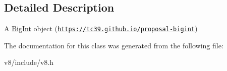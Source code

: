 \subsection{Detailed Description}
A \mbox{\hyperlink{classv8_1_1BigInt}{Big\+Int}} object (\href{https://tc39.github.io/proposal-bigint}{\tt https\+://tc39.\+github.\+io/proposal-\/bigint}) 

The documentation for this class was generated from the following file\+:\begin{DoxyCompactItemize}
\item 
v8/include/v8.\+h\end{DoxyCompactItemize}
